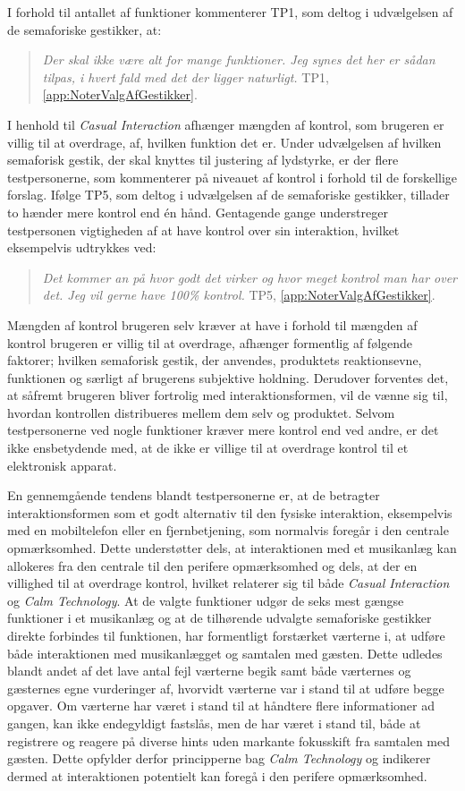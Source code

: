 I forhold til antallet af funktioner kommenterer TP1, som deltog i udvælgelsen af de semaforiske gestikker, at: 
%
\begin{quotation}
	\noindent
	\textit{Der skal ikke være alt for mange funktioner. Jeg synes det her er sådan tilpas, i hvert fald med det der ligger naturligt.} TP1, \autoref{app:NoterValgAfGestikker}.
\noindent
\end{quotation}
%
I henhold til \textit{Casual Interaction} afhænger mængden af kontrol, som brugeren er villig til at overdrage, af, hvilken funktion det er. Under udvælgelsen af hvilken semaforisk gestik, der skal knyttes til justering af lydstyrke, er der flere testpersonerne, som kommenterer på niveauet af kontrol i forhold til de forskellige forslag. Ifølge TP5, som deltog i udvælgelsen af de semaforiske gestikker, tillader to hænder mere kontrol end én hånd. Gentagende gange understreger testpersonen vigtigheden af at have kontrol over sin interaktion, hvilket eksempelvis udtrykkes ved: 
%
\begin{quotation}
	\noindent
	\textit{Det kommer an på hvor godt det virker og hvor meget kontrol man har over det. Jeg vil gerne have 100\% kontrol.} TP5, \autoref{app:NoterValgAfGestikker}.
\noindent
\end{quotation}
%
Mængden af kontrol brugeren selv kræver at have i forhold til mængden af kontrol brugeren er villig til at overdrage, afhænger formentlig af følgende faktorer; hvilken semaforisk gestik, der anvendes, produktets reaktionsevne, funktionen og særligt af brugerens subjektive holdning. Derudover forventes det, at såfremt brugeren bliver fortrolig med interaktionsformen, vil de vænne sig til, hvordan kontrollen distribueres mellem dem selv og produktet. Selvom testpersonerne ved nogle funktioner kræver mere kontrol end ved andre, er det ikke ensbetydende med, at de ikke er villige til at overdrage kontrol til et elektronisk apparat. 

En gennemgående tendens blandt testpersonerne er, at de betragter interaktionsformen som et godt alternativ til den fysiske interaktion, eksempelvis med en mobiltelefon eller en fjernbetjening, som normalvis foregår i den centrale opmærksomhed. Dette understøtter dels, at interaktionen med et musikanlæg kan allokeres fra den centrale til den perifere opmærksomhed og dels, at der en villighed til at overdrage kontrol, hvilket relaterer sig til både \textit{Casual Interaction} og \textit{Calm Technology}. \blankline
%
At de valgte funktioner udgør de seks mest gængse funktioner i et musikanlæg og at de tilhørende udvalgte semaforiske gestikker direkte forbindes til funktionen, har formentligt forstærket værterne i, at udføre både interaktionen med musikanlægget og samtalen med gæsten. Dette udledes blandt andet af det lave antal fejl værterne begik samt både værternes og gæsternes egne vurderinger af, hvorvidt værterne var i stand til at udføre begge opgaver. Om værterne har været i stand til at håndtere flere informationer ad gangen, kan ikke endegyldigt fastslås, men de har været i stand til, både at registrere og reagere på diverse hints uden markante fokusskift fra samtalen med gæsten. Dette opfylder derfor principperne bag \textit{Calm Technology} og indikerer dermed at interaktionen potentielt kan foregå i den perifere opmærksomhed.

